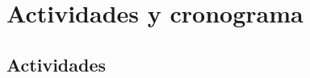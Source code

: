 \documentclass[11pt]{article}
\begin{document}
%
%


\section{Actividades y cronograma}

\subsection{Actividades}
\end{document}
